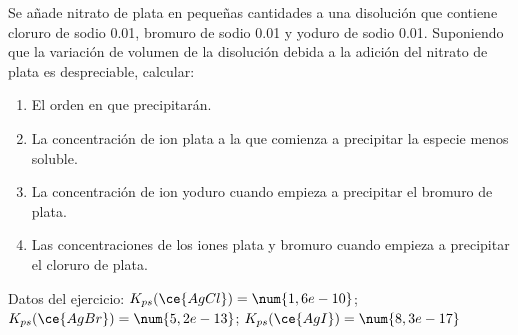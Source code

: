 Se añade nitrato de plata en pequeñas cantidades a una disolución que contiene cloruro de sodio \SI{0,01}{\Molar}, bromuro de sodio \SI{0,01}{\Molar} y yoduro de sodio \SI{0,01}{\Molar}. Suponiendo que la variación de volumen de la disolución debida a la adición del nitrato de plata es despreciable, calcular:
\begin{enumerate}[label={\alph*)},font={\color{red!50!black}\bfseries}]
	\item El orden en que precipitarán.
	\item La concentración de ion plata a la que comienza a precipitar la especie menos soluble.
	\item La concentración de ion yoduro cuando empieza a precipitar el bromuro de plata.
	\item Las concentraciones de los iones plata y bromuro cuando empieza a precipitar el cloruro de plata.
\end{enumerate}
Datos del ejercicio: $K_{ps}(\ce{AgCl}) = \num{1,6e-10}$; $K_{ps}(\ce{AgBr}) = \num{5,2e-13}$; $K_{ps}(\ce{AgI}) = \num{8,3e-17}$
